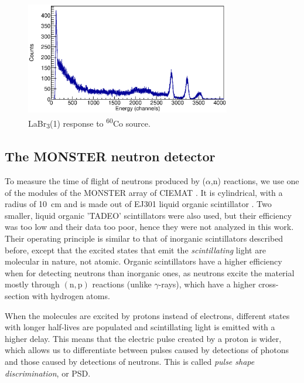 \documentclass[a4paper,12pt]{report}
\newcommand{\an}{($\alpha$,n) }
\begin{document}
\begin{figure}[H]
	\centering
	\includegraphics[width=0.80\textwidth]{labr_co60_calibration.eps}
	\caption{LaBr\textsubscript{3}(1) response to \textsuperscript{60}Co source.}
	\label{labr_co60_calibration}
\end{figure}

\subsection{The MONSTER neutron detector}
To measure the time of flight of neutrons produced by \an reactions, we use one of the modules of the MONSTER array of CIEMAT \cite{MONSTER}.
It is cylindrical, with a radius of \qty{10}{\cm} and is made out of EJ301 liquid organic scintillator \cite{ej301}.
Two smaller, liquid organic 'TADEO' scintillators were also used, but their efficiency was too low and their data too poor, hence they were not analyzed in this work.
\\

Their operating principle is similar to that of inorganic scintillators described before, except that the excited states that emit the \textit{scintillating} light are molecular in nature, not atomic.
Organic scintillators have a higher efficiency when for detecting neutrons than inorganic ones, as neutrons excite the material mostly through $\left( \text{n},\text{p}  \right)$ reactions (unlike $\gamma$-rays), which have a higher cross-section with hydrogen atoms.

When the molecules are excited by protons instead of electrons, different states with longer half-lives are populated and scintillating light is emitted with a higher delay.
This means that the electric pulse created by a proton is wider, which allows us to differentiate between pulses caused by detections of photons and those caused by detections of neutrons.
This is called \textit{pulse shape discrimination}, or PSD.
\end{document}
